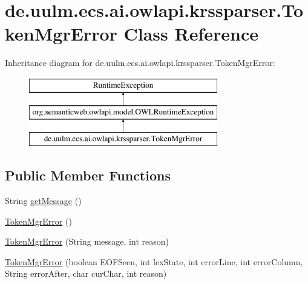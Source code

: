 \hypertarget{classde_1_1uulm_1_1ecs_1_1ai_1_1owlapi_1_1krssparser_1_1_token_mgr_error}{\section{de.\-uulm.\-ecs.\-ai.\-owlapi.\-krssparser.\-Token\-Mgr\-Error Class Reference}
\label{classde_1_1uulm_1_1ecs_1_1ai_1_1owlapi_1_1krssparser_1_1_token_mgr_error}
}
Inheritance diagram for de.\-uulm.\-ecs.\-ai.\-owlapi.\-krssparser.\-Token\-Mgr\-Error\-:\begin{figure}[H]
\begin{center}
\leavevmode
\includegraphics[height=3.000000cm]{classde_1_1uulm_1_1ecs_1_1ai_1_1owlapi_1_1krssparser_1_1_token_mgr_error}
\end{center}
\end{figure}
\subsection*{Public Member Functions}
\begin{DoxyCompactItemize}
\item 
String \hyperlink{classde_1_1uulm_1_1ecs_1_1ai_1_1owlapi_1_1krssparser_1_1_token_mgr_error_a4fca39c58b9a8b1383339e1bd9a514a3}{get\-Message} ()
\item 
\hyperlink{classde_1_1uulm_1_1ecs_1_1ai_1_1owlapi_1_1krssparser_1_1_token_mgr_error_a208080f75339343a0853b80a136f14c3}{Token\-Mgr\-Error} ()
\item 
\hyperlink{classde_1_1uulm_1_1ecs_1_1ai_1_1owlapi_1_1krssparser_1_1_token_mgr_error_a1680b025cbd27af7fcb336ef2d1136a7}{Token\-Mgr\-Error} (String message, int reason)
\item 
\hyperlink{classde_1_1uulm_1_1ecs_1_1ai_1_1owlapi_1_1krssparser_1_1_token_mgr_error_a8965eca85fe9e0207f9f8f79d4ac44b3}{Token\-Mgr\-Error} (boolean E\-O\-F\-Seen, int lex\-State, int error\-Line, int error\-Column, String error\-After, char cur\-Char, int reason)
\end{DoxyCompactItemize}
